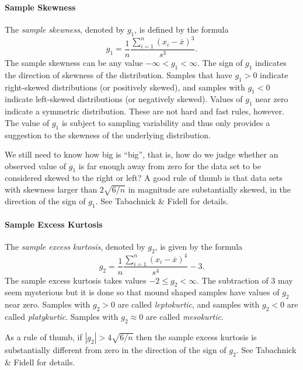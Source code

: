\documentclass[captions=tableheading]{scrbook}
\begin{document}
\paragraph*{Sample Skewness}

The \emph{sample skewness}, denoted by \(g_{1}\), is defined by the formula
\begin{equation}
g_{1}=\frac{1}{n}\frac{\sum_{i=1}^{n}(x_{i}-\overline{x})^{3}}{s^{3}}.
\end{equation}
The sample skewness can be any value \(-\infty<g_{1}<\infty\). The sign of \(g_{1}\) indicates the direction of skewness of the distribution. Samples that have \(g_{1}>0\) indicate right-skewed distributions (or positively skewed), and samples with \(g_{1}<0\) indicate left-skewed distributions (or negatively skewed). Values of \(g_{1}\) near zero indicate a symmetric distribution. These are not hard and fast rules, however. The value of \(g_{1}\) is subject to sampling variability and thus only provides a suggestion to the skewness of the underlying distribution. 

We still need to know how big is ``big'', that is, how do we judge whether an observed value of \(g_{1}\) is far enough away from zero for the data set to be considered skewed to the right or left? A good rule of thumb is that data sets with skewness larger than \(2\sqrt{6/n}\) in magnitude are substantially skewed, in the direction of the sign of \(g_{1}\). See Tabachnick \& Fidell \cite{Tabachnick2006} for details.

\paragraph*{Sample Excess Kurtosis}

The \emph{sample excess kurtosis}, denoted by \(g_{2}\), is given by the formula
\begin{equation}
g_{2}=\frac{1}{n}\frac{\sum_{i=1}^{n}(x_{i}-\overline{x})^{4}}{s^{4}}-3.
\end{equation}
The sample excess kurtosis takes values \(-2\leq g_{2}<\infty\). The subtraction of 3 may seem mysterious but it is done so that mound shaped samples have values of \(g_{2}\) near zero. Samples with \(g_{2}>0\) are called \emph{leptokurtic}, and samples with \(g_{2}<0\) are called \emph{platykurtic}. Samples with \(g_{2}\approx0\) are called \emph{mesokurtic}.

As a rule of thumb, if \(|g_{2}|>4\sqrt{6/n}\) then the sample excess kurtosis is substantially different from zero in the direction of the sign of \(g_{2}\). See Tabachnick \& Fidell \cite{Tabachnick2006} for details.
\end{document}
